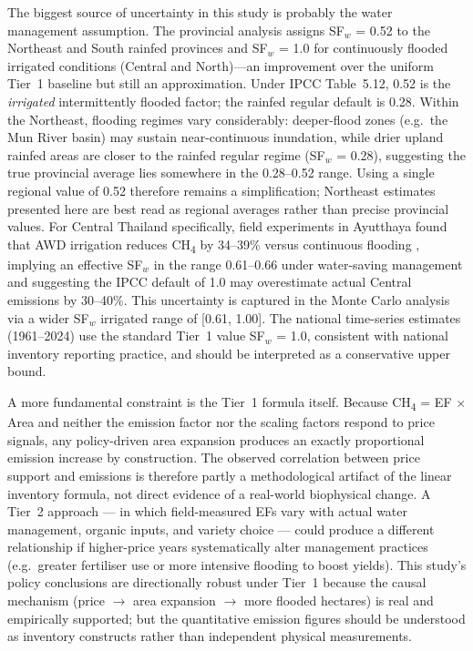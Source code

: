 \documentclass[fleqn,10pt]{olplainarticle}
\begin{document}
The biggest source of uncertainty in this study is probably the water management
assumption.
The provincial analysis assigns SF$_w$ = 0.52 to the Northeast and South rainfed
provinces and SF$_w$ = 1.0 for continuously flooded irrigated conditions (Central
and North)---an improvement over the uniform Tier~1 baseline but still an
approximation.
Under IPCC Table~5.12, 0.52 is the \textit{irrigated} intermittently flooded
factor; the rainfed regular default is 0.28.
Within the Northeast, flooding regimes vary considerably: deeper-flood zones
(e.g.\ the Mun River basin) may sustain near-continuous inundation, while drier
upland rainfed areas are closer to the rainfed regular regime (SF$_w$ = 0.28),
suggesting the true provincial average lies somewhere in the 0.28--0.52 range.
Using a single regional value of 0.52 therefore remains a simplification;
Northeast estimates presented here are best read as regional averages rather
than precise provincial values.
For Central Thailand specifically, field experiments in Ayutthaya found that
AWD irrigation reduces CH\textsubscript{4} by 34--39\% versus continuous
flooding \citep{maneepitak2019}, implying an effective SF$_w$ in the range
0.61--0.66 under water-saving management and suggesting the IPCC default
of 1.0 may overestimate actual Central emissions by 30--40\%.
This uncertainty is captured in the Monte Carlo analysis via a wider
SF$_w$ irrigated range of [0.61, 1.00].
The national time-series estimates (1961--2024) use the standard Tier~1 value
SF$_w$ = 1.0, consistent with national inventory reporting practice, and should
be interpreted as a conservative upper bound.

A more fundamental constraint is the Tier~1 formula itself.
Because CH\textsubscript{4} = EF $\times$ Area and neither the emission factor
nor the scaling factors respond to price signals, any policy-driven area expansion
produces an exactly proportional emission increase by construction.
The observed correlation between price support and emissions is therefore partly
a methodological artifact of the linear inventory formula, not direct evidence of
a real-world biophysical change.
A Tier~2 approach --- in which field-measured EFs vary with actual water management,
organic inputs, and variety choice --- could produce a different relationship if
higher-price years systematically alter management practices (e.g.\ greater fertiliser
use or more intensive flooding to boost yields).
This study's policy conclusions are directionally robust under Tier~1 because the
causal mechanism (price $\rightarrow$ area expansion $\rightarrow$ more flooded
hectares) is real and empirically supported; but the quantitative emission figures
should be understood as inventory constructs rather than independent physical measurements.
\end{document}
